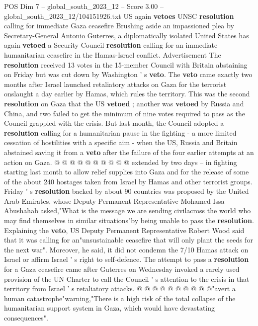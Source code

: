 \begin{textsample}{POS Dim 7 – global\_south\_2023\_12 – Score 3.00 – global\_south\_2023\_12/104151926.txt}  \label{ex:f7_pos_039}
US again \textbf{vetoes} UNSC \textbf{resolution} calling for immediate Gaza ceasefire Brushing aside an impassioned plea by Secretary-General Antonio Guterres, a diplomatically isolated United States has again \textbf{vetoed} a Security Council \textbf{resolution} calling for an immediate humanitarian ceasefire in the Hamas-Israel conflict.
Advertisement The \textbf{resolution} received 13 votes in the 15-member Council with Britain abstaining on Friday but was cut down by Washington ' s \textbf{veto}.
The \textbf{veto} came exactly two months after Israel launched retaliatory attacks on Gaza for the terrorist onslaught a day earlier by Hamas, which rules the territory.
This was the second \textbf{resolution} on Gaza that the US \textbf{vetoed} ; another was \textbf{vetoed} by Russia and China, and two failed to get the minimum of nine votes required to pass as the Council grappled with the crisis.
But last month, the Council adopted a \textbf{resolution} calling for a humanitarian pause in the fighting - a more limited cessation of hostilities with a specific aim - when the US, Russia and Britain abstained saving it from a \textbf{veto} after the failure of the four earlier attempts at an action on Gaza. @ @ @ @ @ @ @ @ @ @ extended by two days -- in fighting starting last month to allow relief supplies into Gaza and for the release of some of the about 240 hostages taken from Israel by Hamas and other terrorist groups.
Friday ' s \textbf{resolution} backed by about 90 countries was proposed by the United Arab Emirates, whose Deputy Permanent Representative Mohamed Issa Abushahab asked,"What is the message we are sending civilacross the world who may find themselves in similar situations"by being unable to pass the \textbf{resolution}.
Explaining the \textbf{veto}, US Deputy Permanent Representative Robert Wood said that it was calling for an"unsustainable ceasefire that will only plant the seeds for the next war".
Moreover, he said, it did not condemn the 7/10 Hamas attack on Israel or affirm Israel ' s right to self-defence.
The attempt to pass a \textbf{resolution} for a Gaza ceasefire came after Guterres on Wednesday invoked a rarely used provision of the UN Charter to call the Council ' s attention to the crisis in that territory from Israel ' s retaliatory attacks. @ @ @ @ @ @ @ @ @ @"avert a human catastrophe"warning,"There is a high risk of the total collapse of the humanitarian support system in Gaza, which would have devastating consequences".

\end{textsample}
